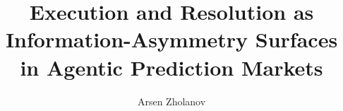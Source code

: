 \documentclass[a4paper, twoside, 11pt]{report}
\title{Execution and Resolution as Information-Asymmetry Surfaces in Agentic Prediction Markets}
\author{Arsen Zholanov}
\begin{document}
\renewcommand{\bibname}{References}






\tableofcontents
\listoftables
\listoffigures













\end{document}
